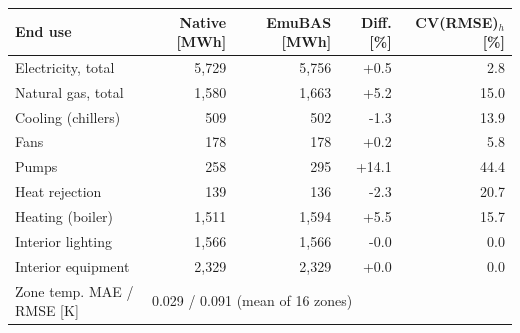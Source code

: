 \begin{tabular}{lrrrr}
\toprule
End use & Native [MWh] & EmuBAS [MWh] & Diff. [\%] & CV(RMSE)$_h$ [\%] \\
\midrule
Electricity, total & 5,729 & 5,756 & +0.5 & 2.8 \\
Natural gas, total & 1,580 & 1,663 & +5.2 & 15.0 \\
Cooling (chillers) & 509 & 502 & -1.3 & 13.9 \\
Fans & 178 & 178 & +0.2 & 5.8 \\
Pumps & 258 & 295 & +14.1 & 44.4 \\
Heat rejection & 139 & 136 & -2.3 & 20.7 \\
Heating (boiler) & 1,511 & 1,594 & +5.5 & 15.7 \\
Interior lighting & 1,566 & 1,566 & -0.0 & 0.0 \\
Interior equipment & 2,329 & 2,329 & +0.0 & 0.0 \\
\midrule
Zone temp. MAE / RMSE [K] & \multicolumn{4}{l}{0.029 / 0.091 (mean of 16 zones)} \\
\bottomrule
\end{tabular}